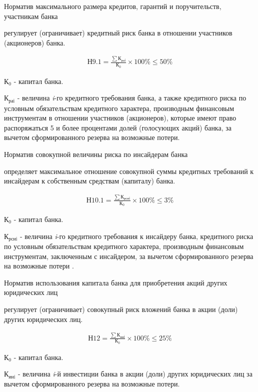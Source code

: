 \documentclass[_Banking_p2.tex]{subfiles}
\begin{document}
\begin{frame}[shrink=15]{\setfontsize{14pt} Норматив максимального размера кредитов, гарантий и поручительств, участникам банка}
\begin{block}
\quad
регулирует (ограничивает) кредитный риск банка в отношении участников (акционеров) банка. 
\end{block}
\begin{align}
\text{Н9.1}=\frac{\sum \text{К}_\text{раi}}{\text{К}_0}\times 100\%\leq 50\%\end{align}

$\text{К}_0$ - капитал банка.

$\text{К}_\text{раi}$ - величина \textit{i}-го кредитного требования банка, а также кредитного риска по условным обязательствам кредитного характера, производным финансовым инструментам в отношении участников (акционеров), которые имеют право распоряжаться 5 и более процентами долей (голосующих акций) банка, за вычетом сформированного резерва на возможные потери.
\end{frame}

\begin{frame}[shrink=15]{Норматив совокупной величины риска по инсайдерам банка}
\begin{block}
\quad
определяет максимальное отношение совокупной суммы кредитных требований к инсайдерам к собственным средствам (капиталу) банка. 
\end{block}
\begin{align}
\text{Н10.1}=\frac{\sum \text{К}_\text{рсиi}}{\text{К}_0}\times 100\%\leq 3\%\end{align}

$\text{К}_0$ - капитал банка.

$\text{К}_\text{рсиi}$ - величина \textit{i}-го кредитного требования к инсайдеру банка, кредитного риска по условным обязательствам кредитного характера, производным финансовым инструментам, заключенным с инсайдером, за вычетом сформированного резерва на возможные потери .
\end{frame}

\begin{frame}[shrink=15]{\setfontsize{14pt} Норматив использования капитала банка для приобретения акций других юридических лиц}
\begin{block}
\quad
регулирует (ограничивает) совокупный риск вложений банка в акции (доли) других юридических лиц. 
\end{block}
\begin{align}
\text{Н12}=\frac{\sum \text{К}_\text{инi}}{\text{К}_0}\times 100\%\leq 25\%\end{align}

$\text{К}_0$ - капитал банка.

$\text{К}_\text{инi}$ - величина \textit{i}-й инвестиции банка в акции (доли) других юридических лиц за вычетом сформированного резерва на возможные потери.
\end{frame}
\end{document}
